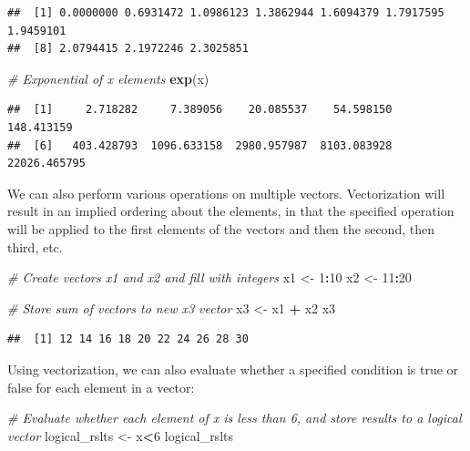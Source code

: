 \documentclass[]{book}
\newenvironment{Shaded}{\begin{snugshade}}{\end{snugshade}}
\newcommand{\CommentTok}[1]{\textcolor[rgb]{0.56,0.35,0.01}{\textit{#1}}}
\newcommand{\DecValTok}[1]{\textcolor[rgb]{0.00,0.00,0.81}{#1}}
\newcommand{\KeywordTok}[1]{\textcolor[rgb]{0.13,0.29,0.53}{\textbf{#1}}}
\newcommand{\NormalTok}[1]{#1}
\newcommand{\OperatorTok}[1]{\textcolor[rgb]{0.81,0.36,0.00}{\textbf{#1}}}
\newcommand{\StringTok}[1]{\textcolor[rgb]{0.31,0.60,0.02}{#1}}
\begin{document}
\begin{verbatim}
##  [1] 0.0000000 0.6931472 1.0986123 1.3862944 1.6094379 1.7917595 1.9459101
##  [8] 2.0794415 2.1972246 2.3025851
\end{verbatim}

\begin{Shaded}
\begin{Highlighting}[]
\CommentTok{# Exponential of x elements}
\KeywordTok{exp}\NormalTok{(x)}
\end{Highlighting}
\end{Shaded}

\begin{verbatim}
##  [1]     2.718282     7.389056    20.085537    54.598150   148.413159
##  [6]   403.428793  1096.633158  2980.957987  8103.083928 22026.465795
\end{verbatim}

We can also perform various operations on multiple vectors. Vectorization will result in an implied ordering about the elements, in that the specified operation will be applied to the first elements of the vectors and then the second, then third, etc.

\begin{Shaded}
\begin{Highlighting}[]
\CommentTok{# Create vectors x1 and x2 and fill with integers}
\NormalTok{x1 <-}\StringTok{ }\DecValTok{1}\OperatorTok{:}\DecValTok{10}
\NormalTok{x2 <-}\StringTok{ }\DecValTok{11}\OperatorTok{:}\DecValTok{20}

\CommentTok{# Store sum of vectors to new x3 vector}
\NormalTok{x3 <-}\StringTok{ }\NormalTok{x1 }\OperatorTok{+}\StringTok{ }\NormalTok{x2}
\NormalTok{x3}
\end{Highlighting}
\end{Shaded}

\begin{verbatim}
##  [1] 12 14 16 18 20 22 24 26 28 30
\end{verbatim}

Using vectorization, we can also evaluate whether a specified condition is true or false for each element in a vector:

\begin{Shaded}
\begin{Highlighting}[]
\CommentTok{# Evaluate whether each element of x is less than 6, and store results to a logical vector}
\NormalTok{logical_rslts <-}\StringTok{ }\NormalTok{x}\OperatorTok{<}\DecValTok{6}
\NormalTok{logical_rslts}
\end{Highlighting}
\end{Shaded}
\end{document}

